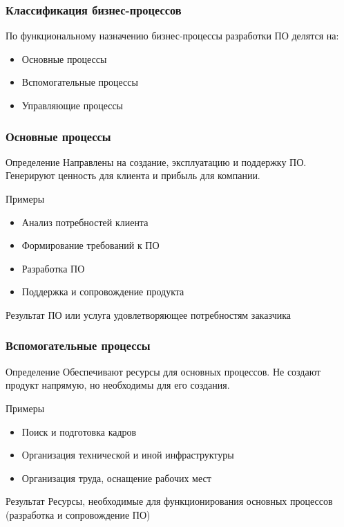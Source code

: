 \documentclass{../industrial-development}
\begin{document}
\begin{frame} \frametitle{Классификация бизнес-процессов}
	По функциональному назначению бизнес-процессы разработки ПО делятся на:
	\begin{itemize}
		\item \alert{Основные процессы}
		\item \alert{Вспомогательные процессы}
		\item \alert{Управляющие процессы}
	\end{itemize}
\end{frame}
\lecturenotes


\begin{frame} \frametitle{Основные процессы}
	\begin{block}{Определение}
		Направлены на создание, эксплуатацию и поддержку ПО. Генерируют ценность для клиента и прибыль для компании.
	\end{block}
	\begin{block}{Примеры}
		\begin{itemize}
			\item Анализ потребностей клиента
			\item Формирование требований к ПО
			\item Разработка ПО
			\item Поддержка и сопровождение продукта
		\end{itemize}
	\end{block}
	\begin{block}{Результат}
		ПО или услуга удовлетворяющее потребностям заказчика
	\end{block}
\end{frame}
\lecturenotes


\begin{frame} \frametitle{Вспомогательные процессы}
	\begin{block}{Определение}
		Обеспечивают ресурсы для основных процессов. Не создают продукт напрямую, но необходимы для его создания.
	\end{block}
	\begin{block}{Примеры}
		\begin{itemize}
			\item Поиск и подготовка кадров
			\item Организация технической и иной инфраструктуры
			\item Организация труда, оснащение рабочих мест
		\end{itemize}
	\end{block}
	\begin{block}{Результат}
		Ресурсы, необходимые для функционирования основных процессов (разработка и сопровождение ПО)
	\end{block}
\end{frame}
\lecturenotes
\end{document}

